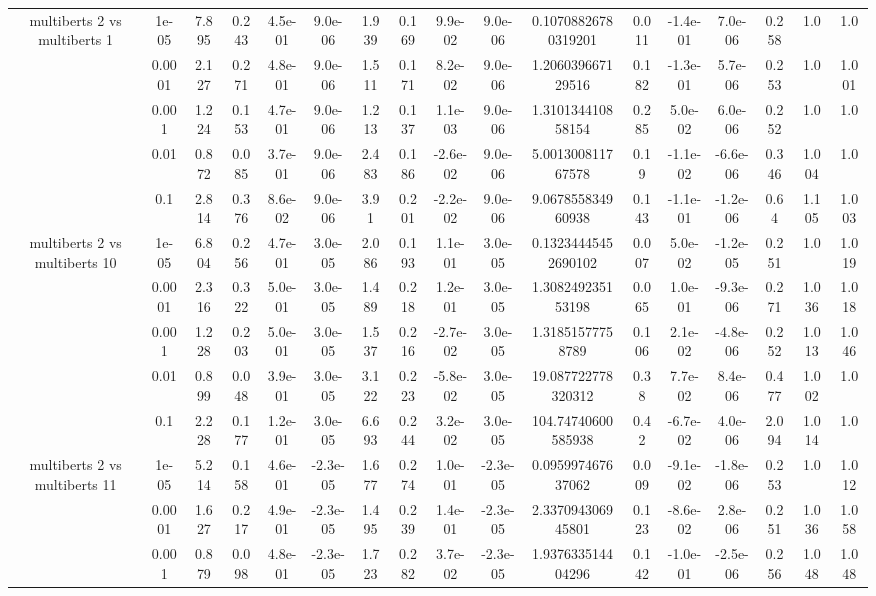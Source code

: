 \begin{tabular}{|c|c|c|c|c|c|c|c|c|c|c|c|c|c|c|c|c|}
\hline
\multirow{5}{*}{multiberts 2 vs multiberts 1} & 1e-05 & 7.895 & 0.243 & 4.5e-01 & 9.0e-06 & 1.939 & 0.169 & 9.9e-02 & 9.0e-06 & 0.10708826780319201 & 0.011 & -1.4e-01 & 7.0e-06 & 0.258 & 1.0 & 1.0 \\
 & 0.0001 & 2.127 & 0.271 & 4.8e-01 & 9.0e-06 & 1.511 & 0.171 & 8.2e-02 & 9.0e-06 & 1.206039667129516 & 0.182 & -1.3e-01 & 5.7e-06 & 0.253 & 1.0 & 1.001 \\
 & 0.001 & 1.224 & 0.153 & 4.7e-01 & 9.0e-06 & 1.213 & 0.137 & 1.1e-03 & 9.0e-06 & 1.310134410858154 & 0.285 & 5.0e-02 & 6.0e-06 & 0.252 & 1.0 & 1.0 \\
 & 0.01 & 0.872 & 0.085 & 3.7e-01 & 9.0e-06 & 2.483 & 0.186 & -2.6e-02 & 9.0e-06 & 5.001300811767578 & 0.19 & -1.1e-02 & -6.6e-06 & 0.346 & 1.004 & 1.0 \\
 & 0.1 & 2.814 & 0.376 & 8.6e-02 & 9.0e-06 & 3.91 & 0.201 & -2.2e-02 & 9.0e-06 & 9.067855834960938 & 0.143 & -1.1e-01 & -1.2e-06 & 0.64 & 1.105 & 1.003 \\
\hline
\multirow{5}{*}{multiberts 2 vs multiberts 10} & 1e-05 & 6.804 & 0.256 & 4.7e-01 & 3.0e-05 & 2.086 & 0.193 & 1.1e-01 & 3.0e-05 & 0.13234445452690102 & 0.007 & 5.0e-02 & -1.2e-05 & 0.251 & 1.0 & 1.019 \\
 & 0.0001 & 2.316 & 0.322 & 5.0e-01 & 3.0e-05 & 1.489 & 0.218 & 1.2e-01 & 3.0e-05 & 1.308249235153198 & 0.065 & 1.0e-01 & -9.3e-06 & 0.271 & 1.036 & 1.018 \\
 & 0.001 & 1.228 & 0.203 & 5.0e-01 & 3.0e-05 & 1.537 & 0.216 & -2.7e-02 & 3.0e-05 & 1.31851577758789 & 0.106 & 2.1e-02 & -4.8e-06 & 0.252 & 1.013 & 1.046 \\
 & 0.01 & 0.899 & 0.048 & 3.9e-01 & 3.0e-05 & 3.122 & 0.223 & -5.8e-02 & 3.0e-05 & 19.087722778320312 & 0.38 & 7.7e-02 & 8.4e-06 & 0.477 & 1.002 & 1.0 \\
 & 0.1 & 2.228 & 0.177 & 1.2e-01 & 3.0e-05 & 6.693 & 0.244 & 3.2e-02 & 3.0e-05 & 104.74740600585938 & 0.42 & -6.7e-02 & 4.0e-06 & 2.094 & 1.014 & 1.0 \\
\hline
\multirow{5}{*}{multiberts 2 vs multiberts 11} & 1e-05 & 5.214 & 0.158 & 4.6e-01 & -2.3e-05 & 1.677 & 0.274 & 1.0e-01 & -2.3e-05 & 0.095997467637062 & 0.009 & -9.1e-02 & -1.8e-06 & 0.253 & 1.0 & 1.012 \\
 & 0.0001 & 1.627 & 0.217 & 4.9e-01 & -2.3e-05 & 1.495 & 0.239 & 1.4e-01 & -2.3e-05 & 2.337094306945801 & 0.123 & -8.6e-02 & 2.8e-06 & 0.251 & 1.036 & 1.058 \\
 & 0.001 & 0.879 & 0.098 & 4.8e-01 & -2.3e-05 & 1.723 & 0.282 & 3.7e-02 & -2.3e-05 & 1.937633514404296 & 0.142 & -1.0e-01 & -2.5e-06 & 0.256 & 1.048 & 1.048 \\

\end{tabular}
